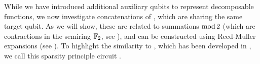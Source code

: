 While we have introduced additional auxiliary qubits to represent decomposable functions, we now investigate concatenations of \computationCircuits{}, which are sharing the same target qubit.
As we will show, these are related to summations $\mathrm{mod}\,2$ (which are contractions in the semiring $\mathbb{F}_2$, see ), and can be constructed using Reed-Muller expansions (see ).
To highlight the similarity to \polynomialSparsity{}, which has been developed in , we call this sparsity principle circuit \polynomialSparsity{}.





